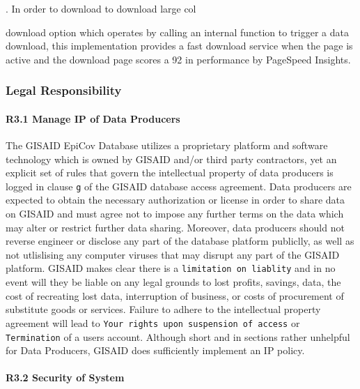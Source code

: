 \documentclass{article}
\begin{document}
. In order to download to download large col

download option which operates by calling an internal function to
trigger a data download, this implementation provides a fast download
service when the page is active and the download page scores a 92 in
performance by PageSpeed Insights.

\hypertarget{legal-responsibility-1}{%
\subsubsection{Legal Responsibility}\label{legal-responsibility-1}}

\hypertarget{r3.1-manage-ip-of-data-producers}{%
\paragraph{R3.1 Manage IP of Data
Producers}\label{r3.1-manage-ip-of-data-producers}}

The GISAID EpiCov Database utilizes a proprietary platform and software
technology which is owned by GISAID and/or third party contractors, yet
an explicit set of rules that govern the intellectual property of data
producers is logged in clause \texttt{g} of the GISAID database access
agreement. Data producers are expected to obtain the necessary
authorization or license in order to share data on GISAID and must agree
not to impose any further terms on the data which may alter or restrict
further data sharing. Moreover, data producers should not reverse
engineer or disclose any part of the database platform publiclly, as
well as not utlislising any computer viruses that may disrupt any part
of the GISAID platform. GISAID makes clear there is a
\texttt{limitation\ on\ liablity} and in no event will they be liable on
any legal grounds to lost profits, savings, data, the cost of recreating
lost data, interruption of business, or costs of procurement of
substitute goods or services. Failure to adhere to the intellectual
property agreement will lead to
\texttt{Your\ rights\ upon\ suspension\ of\ access} or
\texttt{Termination} of a users account. Although short and in sections
rather unhelpful for Data Producers, GISAID does sufficiently implement
an IP policy.

\hypertarget{r3.2-security-of-system}{%
\paragraph{R3.2 Security of System}\label{r3.2-security-of-system}}
\end{document}

